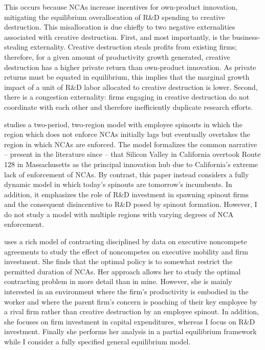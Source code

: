 This occurs because NCAs increase incentives for own-product innovation, mitigating the equilibrium overallocation of R\&D spending to creative destruction. This misallocation is due chiefly to two negative externalities associated with creative destruction. First, and most importantly, is the business-stealing externality. Creative destruction steals profits from existing firms; therefore, for a given amount of productivity growth generated, creative destruction has a higher private return than own-product innovation. As private returns must be equated in equilibrium, this implies that the marginal growth impact of a unit of R\&D labor allocated to creative destruction is lower. Second, there is a congestion externality: firms engaging in creative destruction do not coordinate with each other and therefore inefficiently duplicate research efforts. 


\cite{franco_covenants_2008} studies a two-period, two-region model with employee spinouts in which the region which does not enforce NCAs initially lags but eventually overtakes the region in which NCAs are enforced. The model formalizes the common narrative -- present in the literature since \cite{saxenian_regional_1994} -- that Silicon Valley in California overtook Route 128 in Massachusetts as the principal innovation hub due to California's extreme lack of enforcement of NCAs. By contrast, this paper instead considers a fully dynamic model in which today's spinouts are tomorrow's incumbents. In addition, it emphasizes the role of R\&D investment in spawning spinout firms and the consequent disincentive to R\&D posed by spinout formation. However, I do not study a model with multiple regions with varying degrees of NCA enforcement.

\cite{shi_restrictions_2018} uses a rich model of contracting disciplined by data on executive noncompete agreements to study the effect of noncompetes on executive mobility and firm investment. She finds that the optimal policy is to somewhat restrict the permitted duration of NCAs. Her approach allows her to study the optimal contracting problem in more detail than in mine. However, she is mainly interested in an environment where the firm's productivity is embodied in the worker and where the parent firm's concern is poaching of their key employee by a rival firm rather than creative destruction by an employee spinout. In addition, she focuses on firm investment in capital expenditures, whereas I focus on R\&D investment. Finally she performs her analysis in a partial equilibrium framework while I consider a fully specified general equilibrium model.